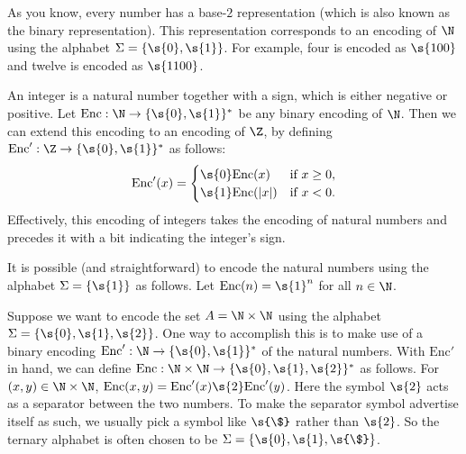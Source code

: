 \begin{example} \label{example:Binary-encoding-of-naturals}
As you know, every number has a base-$2$ representation (which is also known as the binary representation). This representation corresponds to an encoding of $\N$ using the alphabet $\Sigma = \{\s{0},\s{1}\}$. For example, four is encoded as $\s{100}$ and twelve is encoded as $\s{1100}$.
\end{example}

\begin{example} \label{example:Binary-encoding-of-integers}
An integer is a natural number together with a sign, which is either negative or positive. Let $\text{Enc} : \N \to \{\s{0},\s{1}\}^*$ be any binary encoding of $\N$. Then we can extend this encoding to an encoding of $\Z$, by defining $\text{Enc}':\Z \to \{\s{0},\s{1}\}^*$ as follows:
\[
\text{Enc}'(x) = 
\begin{cases}
\s{0}\text{Enc}(x) & \text{if $x \geq 0$}, \\
\s{1}\text{Enc}(|x|) & \text{if $x < 0$}.
\end{cases}
\]
Effectively, this encoding of integers takes the encoding of natural numbers and precedes it with a bit indicating the integer's sign.
\end{example}

\begin{example} \label{example:Unary-encoding-of-naturals}
It is possible (and straightforward) to encode the natural numbers using the alphabet $\Sigma = \{\s{1}\}$ as follows. Let $\text{Enc}(n) = \s{1}^n$ for all $n \in \N$.
\end{example}

\begin{example} \label{example:Ternary-encoding-of-pairs-of-naturals}
Suppose we want to encode the set $A = \N \times \N$ using the alphabet $\Sigma = \{\s{0},\s{1},\s{2}\}$. One way to accomplish this is to make use of a binary encoding $\text{Enc}': \N \to \{\s{0},\s{1}\}^*$ of the natural numbers. With $\text{Enc}'$ in hand, we can define $\text{Enc} : \N \times \N \to \{\s{0},\s{1},\s{2}\}^*$ as follows. For $(x,y) \in \N \times \N$, $\text{Enc}(x,y) = \text{Enc}'(x)\s{2}\text{Enc}'(y)$. Here the symbol $\s{2}$ acts as a separator between the two numbers. To make the separator symbol advertise itself as such, we usually pick a symbol like $\s{\$}$ rather than $\s{2}$. So the ternary alphabet is often chosen to be $\Sigma = \{\s{0},\s{1},\s{\$}\}$.
\end{example}

